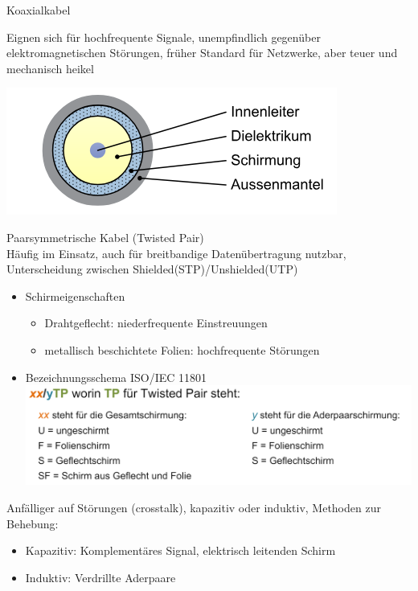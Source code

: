     \begin{definition}{Koaxialkabel}\\
        \begin{minipage}{0.65\linewidth}
            Eignen sich für hochfrequente Signale, unempfindlich gegenüber elektromagnetischen Störungen, früher Standard für Netzwerke, aber teuer und mechanisch heikel
        \end{minipage}
        \begin{minipage}{0.3\linewidth}
            \includegraphics[width=1\linewidth]{images/Koaxkabel.png}
        \end{minipage}
    \end{definition}

    \begin{definition}{Paarsymmetrische Kabel (Twisted Pair)}\\
        Häufig im Einsatz, auch für breitbandige Datenübertragung nutzbar, 
        Unterscheidung zwischen Shielded(STP)/Unshielded(UTP)
        \begin{itemize}
            \item Schirmeigenschaften
            \begin{itemize}
                \item Drahtgeflecht: niederfrequente Einstreuungen
                \item metallisch beschichtete Folien: hochfrequente Störungen
            \end{itemize}
            \item Bezeichnungsschema ISO/IEC 11801\\
            \includegraphics[width=\linewidth]{images/STP_Schirmeigenschaften.png}
        \end{itemize}
        Anfälliger auf Störungen (crosstalk), kapazitiv oder induktiv, Methoden zur Behebung:
        \begin{itemize}
            \item Kapazitiv: Komplementäres Signal, elektrisch leitenden Schirm
            \item Induktiv: Verdrillte Aderpaare
        \end{itemize}
    \end{definition}

